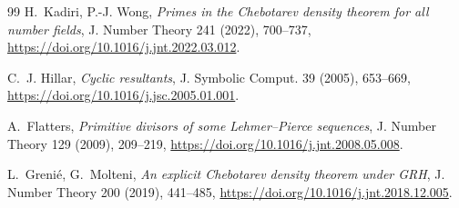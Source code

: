 \documentclass[11pt]{amsart}
\theoremstyle{definition}
\theoremstyle{remark}
\begin{document}
\begin{thebibliography}{99}
H.~Kadiri, P.-J. Wong,
\emph{Primes in the Chebotarev density theorem for all number fields},
J. Number Theory 241 (2022), 700--737,
\url{https://doi.org/10.1016/j.jnt.2022.03.012}.

C.~J. Hillar,
\emph{Cyclic resultants},
J. Symbolic Comput. 39 (2005), 653--669,
\url{https://doi.org/10.1016/j.jsc.2005.01.001}.

A.~Flatters,
\emph{Primitive divisors of some Lehmer--Pierce sequences},
J. Number Theory 129 (2009), 209--219,
\url{https://doi.org/10.1016/j.jnt.2008.05.008}.

L.~Greni\'e, G.~Molteni,
\emph{An explicit Chebotarev density theorem under GRH},
J. Number Theory 200 (2019), 441--485,
\url{https://doi.org/10.1016/j.jnt.2018.12.005}.

\end{thebibliography}
\end{document}
